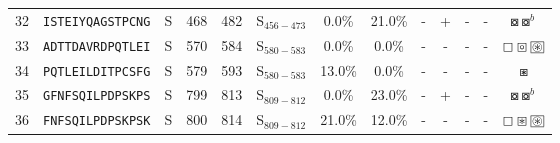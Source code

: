 \begin{tabular}{rcccccccccccc}
32 &  \texttt{ISTEIYQAGSTPCNG} &       S &    468 &   482 &  S$_{456-473}$ &                           0.0\% &                           21.0\% &          - &           + &          - &           - &                                                            $ \boxcircle \boxcircle^b $ \\
33 &  \texttt{ADTTDAVRDPQTLEI} &       S &    570 &   584 &  S$_{580-583}$ &                           0.0\% &                            0.0\% &          - &           - &          - &           - &               $ \boxempty \boxcircle \setlength{\fboxsep}{0.5pt} \boxed{\circledast} $ \\
34 &  \texttt{PQTLEILDITPCSFG} &       S &    579 &   593 &  S$_{580-583}$ &                          13.0\% &                            0.0\% &          - &           - &          - &           - &                                                                            $ \boxast $ \\
35 &  \texttt{GFNFSQILPDPSKPS} &       S &    799 &   813 &  S$_{809-812}$ &                           0.0\% &                           23.0\% &          - &           + &          - &           - &                                                            $ \boxcircle \boxcircle^b $ \\
36 &  \texttt{FNFSQILPDPSKPSK} &       S &    800 &   814 &  S$_{809-812}$ &                          21.0\% &                           12.0\% &          - &           - &          - &           - &                  $ \boxempty \boxast \setlength{\fboxsep}{0.5pt} \boxed{\circledast} $ \\
\bottomrule
\end{tabular}
